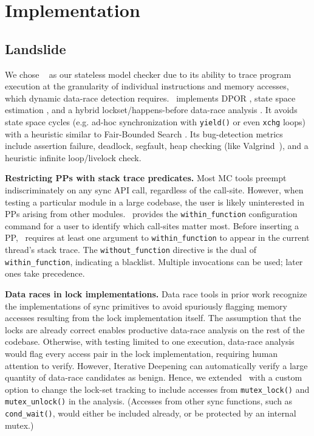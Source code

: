 \section{Implementation}
\label{sec:implementation}

\subsection{Landslide}
\label{sec:landslide}

We chose \landslide~\cite{landslide} as our stateless model checker due to its ability to trace program execution at the granularity of individual instructions and memory accesses, which dynamic data-race detection requires.
\landslide~implements DPOR \cite{dpor},
state space estimation \cite{estimation}, and a hybrid lockset/happens-before data-race analysis \cite{hybriddatarace}.
It avoids state space cycles (e.g. ad-hoc synchronization with {\tt yield()} or even {\tt xchg} loops) with a heuristic similar to Fair-Bounded Search \cite{bpor}.
Its bug-detection metrics include assertion failure, deadlock, segfault, heap checking (like Valgrind~\cite{valgrind}), and a heuristic infinite loop/livelock check.

{\bf Restricting PPs with stack trace predicates.}
Most MC tools preempt indiscriminately on any sync API call, regardless of the call-site.
However, when testing a particular module in a large codebase,
the user is likely uninterested in PPs arising from other modules.
\landslide~provides the {\tt within\_function} configuration command for a user to identify which call-sites matter most.
Before inserting a PP, \landslide~requires at least one argument to {\tt within\_function} to appear in the current thread's stack trace.
The {\tt without\_function} directive is the dual of {\tt within\_function}, indicating a blacklist.
Multiple invocations can be used; later ones take precedence.

{\bf Data races in lock implementations.}
Data race tools in prior work \cite{tsan,portend} recognize the implementations of sync primitives to avoid spuriously flagging memory accesses resulting from the lock implementation itself.
The assumption that the locks are already correct enables productive data-race analysis on the rest of the codebase.
Otherwise, with testing limited to one execution,
data-race analysis would flag every access pair in the lock implementation, requiring human attention to verify.
However, Iterative Deepening can automatically verify a large quantity of data-race candidates as benign.
Hence, we extended \landslide~with a custom option to change the lock-set tracking to include accesses from {\tt mutex\_lock()} and {\tt mutex\_unlock()} in the analysis. (Accesses from other sync functions, such as {\tt cond\_wait()}, would either be included already, or be protected by an internal mutex.)

